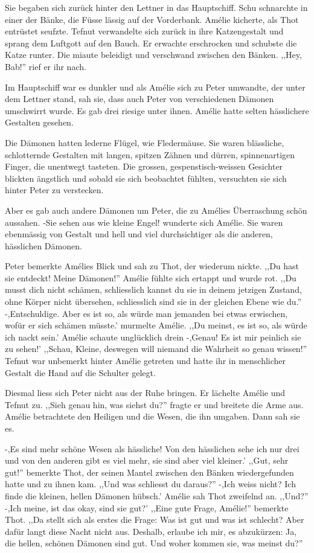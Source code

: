 \documentclass[11pt,titlepage,a5paper]{book}
\begin{document}
Sie begaben sich zurück hinter den Lettner in das Hauptschiff. Schu schnarchte in einer der Bänke, die Füsse lässig auf der Vorderbank. Amélie kicherte, als Thot entrüstet seufzte. Tefnut verwandelte sich zurück in ihre Katzengestalt und sprang dem Luftgott auf den Bauch. Er erwachte erschrocken und schubste die Katze runter. Die miaute beleidigt und verschwand zwischen den Bänken. ,,Hey, Bab!'' rief er ihr nach.

Im Hauptschiff war es dunkler und als Amélie sich zu Peter umwandte, der unter dem Lettner stand, sah sie, dass auch Peter von verschiedenen Dämonen umschwirrt wurde. Es gab drei riesige unter ihnen. Amélie hatte selten hässlichere Gestalten gesehen. 

Die Dämonen hatten lederne Flügel, wie Fledermäuse. Sie waren blässliche, schlotternde Gestalten mit langen, spitzen Zähnen und dürren, spinnenartigen Finger, die unentwegt tasteten. Die grossen, gespenstisch-weissen Gesichter blickten ängstlich und sobald sie sich beobachtet fühlten, versuchten sie sich hinter Peter zu verstecken.

Aber es gab auch andere Dämonen um Peter, die zu Amélies Überraschung schön aussahen. -Sie sehen aus wie kleine Engel! wunderte sich Amélie. Sie waren ebenmässig von Gestalt und hell und viel durchsichtiger als die anderen, hässlichen Dämonen. 

Peter bemerkte Amélies Blick und sah zu Thot, der wiederum nickte. ,,Du hast sie entdeckt! Meine Dämonen!'' Amélie fühlte sich ertappt und wurde rot. ,,Du musst dich nicht schämen, schliesslich kannst du sie in deinem jetzigen Zustand, ohne Körper nicht übersehen, schliesslich sind sie in der gleichen Ebene wie du.'' -,Entschuldige. Aber es ist so, als würde man jemanden bei etwas erwischen, wofür er sich schämen müsste.' murmelte Amélie. ,,Du meinst, es ist so, als würde ich nackt sein.' Amélie schaute unglücklich drein -,Genau! Es ist mir peinlich sie zu sehen!' ,,Schau, Kleine, deswegen will niemand die Wahrheit so genau wissen!'' Tefnut war unbemerkt hinter Amélie getreten und hatte ihr in menschlicher Gestalt die Hand auf die Schulter gelegt. 

Diesmal liess sich Peter nicht aus der Ruhe bringen. Er lächelte Amélie und Tefnut zu. ,,Sieh genau hin, was siehst du?'' fragte er und breitete die Arme aus. Amélie betrachtete den Heiligen und die Wesen, die ihn umgaben. Dann sah sie es.

-,Es sind mehr schöne Wesen als hässliche! Von den hässlichen sehe ich nur drei und von den anderen gibt es viel mehr, sie sind aber viel kleiner.' ,,Gut, sehr gut!'' bemerkte Thot, der seinen Mantel zwischen den Bänken wiedergefunden hatte und zu ihnen kam. ,,Und was schliesst du daraus?'' -,Ich weiss nicht? Ich finde die kleinen, hellen Dämonen hübsch.' Amélie sah Thot zweifelnd an. ,,Und?'' -,Ich meine, ist das okay, sind sie gut?' ,,Eine gute Frage, Amélie!'' bemerkte Thot. ,,Da stellt sich als erstes die Frage: Was ist gut und was ist schlecht? Aber dafür langt diese Nacht nicht aus. Deshalb, erlaube ich mir, es abzukürzen: Ja, die hellen, schönen Dämonen sind gut. Und woher kommen sie, was meinst du?'' 
\end{document}
